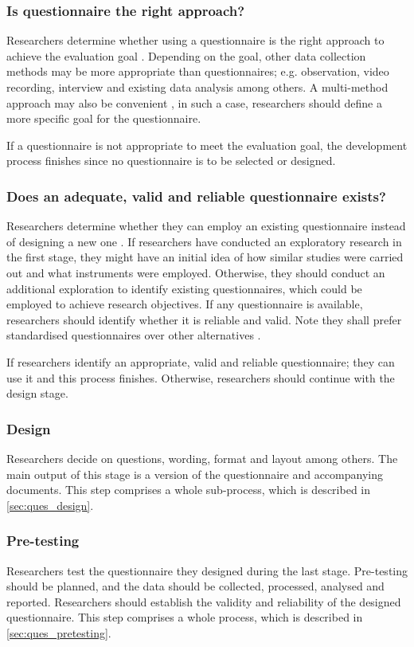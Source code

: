 \subsubsection{Is questionnaire the right approach?}
Researchers determine whether using a questionnaire is the right approach to achieve the evaluation goal \autocite{Boynton2004c}. Depending on the goal, other data collection methods may be more appropriate than questionnaires; e.g. observation, video recording, interview and existing data analysis among others. A multi-method approach may also be convenient \autocite{Boynton2004c,Krosnick2009}, in such a case, researchers should define a more specific goal for the questionnaire.

If a questionnaire is not appropriate to meet the evaluation goal, the development process finishes since no questionnaire is to be selected or designed.

\subsubsection{Does an adequate, valid and reliable questionnaire exists?}
Researchers determine whether they can employ an existing questionnaire instead of designing a new one \autocite{Boynton2004c}. If researchers have conducted an exploratory research in the first stage, they might have an initial idea of how similar studies were carried out and what instruments were employed. Otherwise, they should conduct an additional exploration to identify existing questionnaires, which could be employed to achieve research objectives. If any questionnaire is available, researchers should identify whether it is reliable and valid. Note they shall prefer standardised questionnaires over other alternatives \autocite{Boynton2004c}.

If researchers identify an appropriate, valid and reliable questionnaire; they can use it and this process finishes. Otherwise, researchers should continue with the design stage.

\subsubsection{Design}
Researchers decide on questions, wording, format and layout among others. The main output of this stage is a version of the questionnaire and accompanying documents. This step comprises a whole sub-process, which is described in \autoref{sec:ques_design}.

\subsubsection{Pre-testing}
Researchers test the questionnaire they designed during the last stage. Pre-testing should be planned, and the data should be collected, processed, analysed and reported. Researchers should establish the validity and reliability of the designed questionnaire. This step comprises a whole process, which is described in \autoref{sec:ques_pretesting}.

